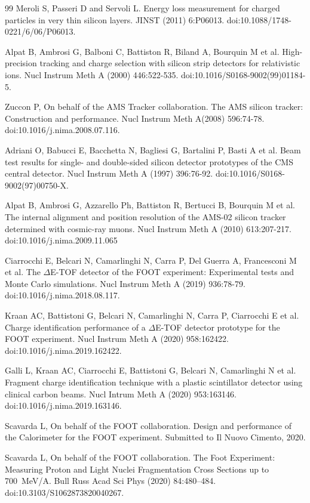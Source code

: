 \documentclass[utf8]{frontiersFPHY} %
\begin{document}
\begin{thebibliography}{99}
 Meroli S, Passeri D and Servoli L. Energy loss measurement for charged particles in very thin silicon layers. JINST (2011) 6:P06013. doi:10.1088/1748-0221/6/06/P06013.

Alpat B, Ambrosi G, Balboni C, Battiston R, Biland A, Bourquin M et al. High-precision tracking and charge selection with silicon strip detectors for relativistic ions. Nucl Instrum Meth A (2000) 446:522-535. doi:10.1016/S0168-9002(99)01184-5.

 Zuccon P, On behalf of the AMS Tracker collaboration. The AMS silicon tracker: Construction and performance. Nucl Instrum Meth A(2008) 596:74-78. doi:10.1016/j.nima.2008.07.116.

 Adriani O, Babucci E, Bacchetta N, Bagliesi G, Bartalini P, Basti A et al. Beam test results for single- and double-sided silicon detector prototypes of the CMS central detector. Nucl Instrum Meth A (1997) 396:76-92. doi:10.1016/S0168-9002(97)00750-X.

 Alpat B, Ambrosi G, Azzarello Ph, Battiston R, Bertucci B, Bourquin M et al. The internal alignment and position resolution of the AMS-02 silicon tracker determined with cosmic-ray muons. Nucl Instrum Meth A (2010) 613:207-217. doi:10.1016/j.nima.2009.11.065

 Ciarrocchi E, Belcari N, Camarlinghi N, Carra P, Del Guerra A, Francesconi M et al. The $\Delta$E-TOF detector of the FOOT experiment: Experimental tests and Monte Carlo simulations. Nucl Instrum Meth A (2019) 936:78-79. doi:10.1016/j.nima.2018.08.117.

 Kraan AC, Battistoni G, Belcari N, Camarlinghi N, Carra P, Ciarrocchi E et al. Charge identification performance of a $\Delta$E-TOF detector prototype for the FOOT experiment. Nucl Instrum Meth A (2020) 958:162422. doi:10.1016/j.nima.2019.162422.

 Galli L, Kraan AC, Ciarrocchi E, Battistoni G, Belcari N, Camarlinghi N et al. Fragment charge identification technique with a plastic scintillator detector using clinical carbon beams. Nucl Intrum Meth A (2020) 953:163146. doi:10.1016/j.nima.2019.163146.

 Scavarda L, On behalf of the FOOT collaboration. Design and performance of the Calorimeter for the FOOT experiment. Submitted to Il Nuovo Cimento, 2020.

 Scavarda L, On behalf of the FOOT collaboration. The Foot Experiment: Measuring Proton and Light Nuclei Fragmentation Cross Sections up to 700~MeV/A. Bull Russ Acad Sci Phys (2020) 84:480–484. doi:10.3103/S1062873820040267.


\end{thebibliography}
\end{document}
